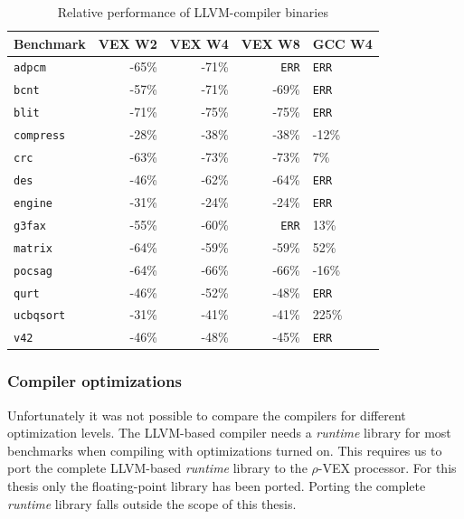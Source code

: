 \begin{table}
  \centering
    \begin{tabular}{|l|r|r|r|l|}
    \hline
    \textbf{Benchmark} & \multicolumn{1}{|r|}{\textbf{VEX W2}} & \multicolumn{1}{|r|}{\textbf{VEX W4}}  & \multicolumn{1}{|r|}{\textbf{VEX W8}} & \textbf{GCC W4} \\ \hline
	\texttt{adpcm} 		&  -65\% &  -71\% & \texttt{ERR} & \texttt{ERR}	\\ \hline
	\texttt{bcnt} 		&  -57\% &  -71\% & -69\% & \texttt{ERR}		\\ \hline
	\texttt{blit} 		&  -71\% &  -75\% & -75\% & \texttt{ERR}		\\ \hline
	\texttt{compress} 	&  -28\% &  -38\% & -38\% & -12\%			\\ \hline
	\texttt{crc} 		&  -63\% &  -73\% & -73\% & 7\%				\\ \hline
	\texttt{des} 		&  -46\% &  -62\% & -64\% & \texttt{ERR}	\\ \hline
	\texttt{engine} 	&  -31\% &  -24\% & -24\% & \texttt{ERR}	\\ \hline
	\texttt{g3fax} 		&  -55\% &  -60\% & \texttt{ERR} & 13\%		\\ \hline
	\texttt{matrix} 	&  -64\% &  -59\% & -59\% & 52\%			\\ \hline
	\texttt{pocsag} 	&  -64\% &  -66\% & -66\% & -16\%			\\ \hline
	\texttt{qurt}	 	&  -46\% &  -52\% & -48\% & \texttt{ERR}	\\ \hline
	\texttt{ucbqsort} 	&  -31\% &  -41\% & -41\% & 225\%			\\ \hline
	\texttt{v42}	 	&  -46\% &  -48\% & -45\% & \texttt{ERR}	\\ \hline
    \end{tabular}
  \caption{Relative performance of LLVM-compiler binaries}
  \label{tbl:rel_perf}
\end{table}

\subsubsection{Compiler optimizations}
Unfortunately it was not possible to compare the compilers for different optimization levels. The LLVM-based compiler needs a \emph{runtime} library for most benchmarks when compiling with optimizations turned on. This requires us to port the complete LLVM-based \emph{runtime} library to the $\rho$-VEX processor. For this thesis only the floating-point library has been ported. Porting the complete \emph{runtime} library falls outside the scope of this thesis.

